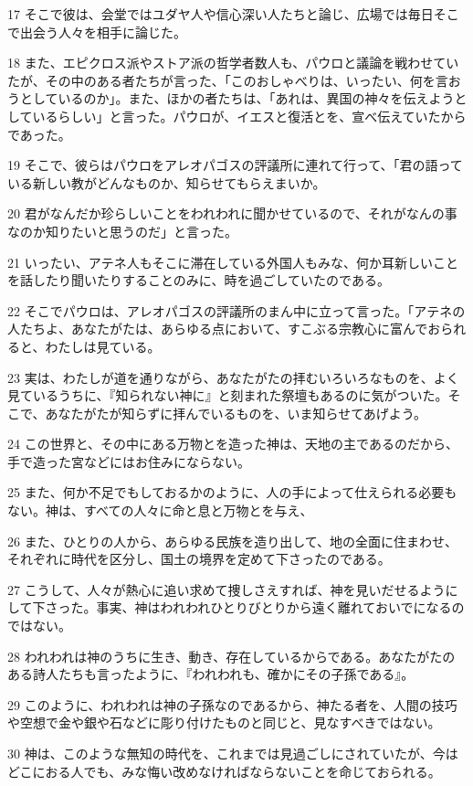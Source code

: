 \par 17 そこで彼は、会堂ではユダヤ人や信心深い人たちと論じ、広場では毎日そこで出会う人々を相手に論じた。
\par 18 また、エピクロス派やストア派の哲学者数人も、パウロと議論を戦わせていたが、その中のある者たちが言った、「このおしゃべりは、いったい、何を言おうとしているのか」。また、ほかの者たちは、「あれは、異国の神々を伝えようとしているらしい」と言った。パウロが、イエスと復活とを、宣べ伝えていたからであった。
\par 19 そこで、彼らはパウロをアレオパゴスの評議所に連れて行って、「君の語っている新しい教がどんなものか、知らせてもらえまいか。
\par 20 君がなんだか珍らしいことをわれわれに聞かせているので、それがなんの事なのか知りたいと思うのだ」と言った。
\par 21 いったい、アテネ人もそこに滞在している外国人もみな、何か耳新しいことを話したり聞いたりすることのみに、時を過ごしていたのである。
\par 22 そこでパウロは、アレオパゴスの評議所のまん中に立って言った。「アテネの人たちよ、あなたがたは、あらゆる点において、すこぶる宗教心に富んでおられると、わたしは見ている。
\par 23 実は、わたしが道を通りながら、あなたがたの拝むいろいろなものを、よく見ているうちに、『知られない神に』と刻まれた祭壇もあるのに気がついた。そこで、あなたがたが知らずに拝んでいるものを、いま知らせてあげよう。
\par 24 この世界と、その中にある万物とを造った神は、天地の主であるのだから、手で造った宮などにはお住みにならない。
\par 25 また、何か不足でもしておるかのように、人の手によって仕えられる必要もない。神は、すべての人々に命と息と万物とを与え、
\par 26 また、ひとりの人から、あらゆる民族を造り出して、地の全面に住まわせ、それぞれに時代を区分し、国土の境界を定めて下さったのである。
\par 27 こうして、人々が熱心に追い求めて捜しさえすれば、神を見いだせるようにして下さった。事実、神はわれわれひとりびとりから遠く離れておいでになるのではない。
\par 28 われわれは神のうちに生き、動き、存在しているからである。あなたがたのある詩人たちも言ったように、『われわれも、確かにその子孫である』。
\par 29 このように、われわれは神の子孫なのであるから、神たる者を、人間の技巧や空想で金や銀や石などに彫り付けたものと同じと、見なすべきではない。
\par 30 神は、このような無知の時代を、これまでは見過ごしにされていたが、今はどこにおる人でも、みな悔い改めなければならないことを命じておられる。
